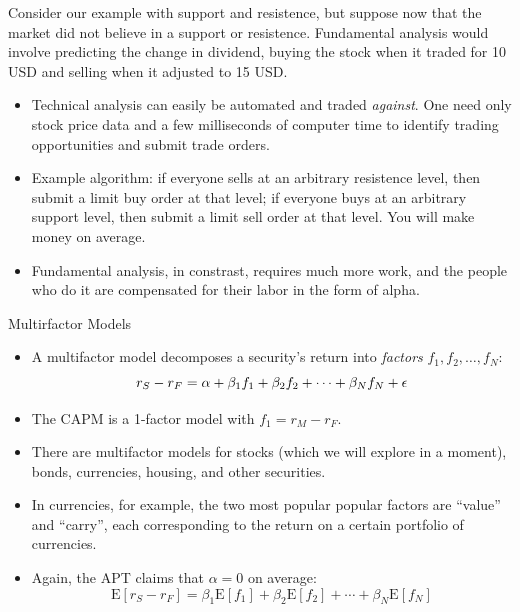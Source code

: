 \documentclass{beamer}
\begin{document}
\begin{frame}{}
	Consider our example with support and resistence, but suppose now that the market did not believe in a support or resistence. Fundamental analysis would involve predicting the change in dividend, buying the stock when it traded for 10 USD and selling when it adjusted to 15 USD.  
\end{frame}

\begin{frame}{}
	\begin{itemize}
		\item Technical analysis can easily be automated and traded \textit{against}. One need only stock price data and a few milliseconds of computer time to identify trading opportunities and submit trade orders.
		\item Example algorithm: if everyone sells at an arbitrary resistence level, then submit a limit buy order at that level; if everyone buys at an arbitrary support level, then submit a limit sell order at that level. You will make money on average. 
		\item Fundamental analysis, in constrast, requires much more work, and the people who do it are compensated for their labor in the form of alpha. 
	\end{itemize}
\end{frame}

\begin{frame}
	\begin{center}
		\Huge Multirfactor Models
	\end{center}
\end{frame}

\begin{frame}{}

	\begin{itemize}
		\item A multifactor model decomposes a security's return into \textit{factors} $f_{1},f_{2},\ldots,f_{N}$:
			\begin{equation}\small
				r_{S}-r_{F}=\alpha+\beta_{1}f_{1}+\beta_{2}f_{2}+\cdots+\beta_{N}f_{N}+\epsilon
			\end{equation}
		\item The CAPM is a 1-factor model with $f_{1}=r_{M}-r_{F}$. 
		\item There are multifactor models for stocks (which we will explore in a moment), bonds, currencies, housing, and other securities. 
		\item In currencies, for example, the two most popular popular factors are ``value'' and ``carry'', each corresponding to the return on a certain portfolio of currencies. 
		\item Again, the APT claims that $\alpha=0$ on average:
			\begin{equation}
				\text{E}[r_{S}-r_{F}]=\beta_{1}\text{E}[f_{1}]+\beta_{2}\text{E}[f_{2}]+\cdots+\beta_{N}\text{E}[f_{N}]
			\end{equation}
	\end{itemize}
\end{frame}
\end{document}
